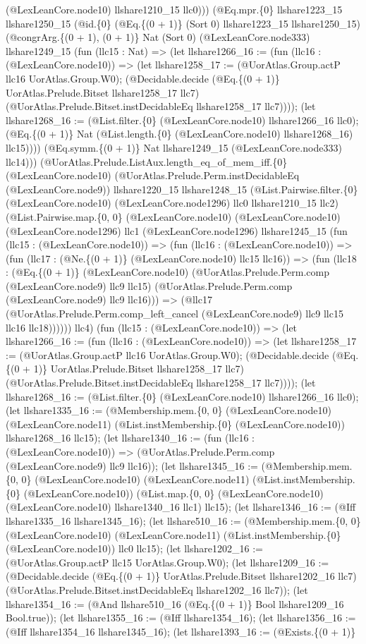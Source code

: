 \documentclass[11pt]{article}
\begin{document}
(@LexLeanCore.node10) llshare1210\_15 llc0))) (@Eq.mpr.\{0\} llshare1223\_15 llshare1250\_15 (@id.\{0\} (@Eq.\{(0 + 1)\} (Sort 0) llshare1223\_15 llshare1250\_15) (@congrArg.\{(0 + 1), (0 + 1)\} Nat (Sort 0) (@LexLeanCore.node333) llshare1249\_15 (fun (llc15 : Nat) => (let llshare1266\_16 := (fun (llc16 : (@LexLeanCore.node10)) => (let llshare1258\_17 := (@UorAtlas.Group.actP llc16 UorAtlas.Group.W0); (@Decidable.decide (@Eq.\{(0 + 1)\} UorAtlas.Prelude.Bitset llshare1258\_17 llc7) (@UorAtlas.Prelude.Bitset.instDecidableEq llshare1258\_17 llc7)))); (let llshare1268\_16 := (@List.filter.\{0\} (@LexLeanCore.node10) llshare1266\_16 llc0); (@Eq.\{(0 + 1)\} Nat (@List.length.\{0\} (@LexLeanCore.node10) llshare1268\_16) llc15)))) (@Eq.symm.\{(0 + 1)\} Nat llshare1249\_15 (@LexLeanCore.node333) llc14))) (@UorAtlas.Prelude.ListAux.length\_eq\_of\_mem\_iff.\{0\} (@LexLeanCore.node10) (@UorAtlas.Prelude.Perm.instDecidableEq (@LexLeanCore.node9)) llshare1220\_15 llshare1248\_15 (@List.Pairwise.filter.\{0\} (@LexLeanCore.node10) (@LexLeanCore.node1296) llc0 llshare1210\_15 llc2) (@List.Pairwise.map.\{0, 0\} (@LexLeanCore.node10) (@LexLeanCore.node10) (@LexLeanCore.node1296) llc1 (@LexLeanCore.node1296) llshare1245\_15 (fun (llc15 : (@LexLeanCore.node10)) => (fun (llc16 : (@LexLeanCore.node10)) => (fun (llc17 : (@Ne.\{(0 + 1)\} (@LexLeanCore.node10) llc15 llc16)) => (fun (llc18 : (@Eq.\{(0 + 1)\} (@LexLeanCore.node10) (@UorAtlas.Prelude.Perm.comp (@LexLeanCore.node9) llc9 llc15) (@UorAtlas.Prelude.Perm.comp (@LexLeanCore.node9) llc9 llc16))) => (@llc17 (@UorAtlas.Prelude.Perm.comp\_left\_cancel (@LexLeanCore.node9) llc9 llc15 llc16 llc18)))))) llc4) (fun (llc15 : (@LexLeanCore.node10)) => (let llshare1266\_16 := (fun (llc16 : (@LexLeanCore.node10)) => (let llshare1258\_17 := (@UorAtlas.Group.actP llc16 UorAtlas.Group.W0); (@Decidable.decide (@Eq.\{(0 + 1)\} UorAtlas.Prelude.Bitset llshare1258\_17 llc7) (@UorAtlas.Prelude.Bitset.instDecidableEq llshare1258\_17 llc7)))); (let llshare1268\_16 := (@List.filter.\{0\} (@LexLeanCore.node10) llshare1266\_16 llc0); (let llshare1335\_16 := (@Membership.mem.\{0, 0\} (@LexLeanCore.node10) (@LexLeanCore.node11) (@List.instMembership.\{0\} (@LexLeanCore.node10)) llshare1268\_16 llc15); (let llshare1340\_16 := (fun (llc16 : (@LexLeanCore.node10)) => (@UorAtlas.Prelude.Perm.comp (@LexLeanCore.node9) llc9 llc16)); (let llshare1345\_16 := (@Membership.mem.\{0, 0\} (@LexLeanCore.node10) (@LexLeanCore.node11) (@List.instMembership.\{0\} (@LexLeanCore.node10)) (@List.map.\{0, 0\} (@LexLeanCore.node10) (@LexLeanCore.node10) llshare1340\_16 llc1) llc15); (let llshare1346\_16 := (@Iff llshare1335\_16 llshare1345\_16); (let llshare510\_16 := (@Membership.mem.\{0, 0\} (@LexLeanCore.node10) (@LexLeanCore.node11) (@List.instMembership.\{0\} (@LexLeanCore.node10)) llc0 llc15); (let llshare1202\_16 := (@UorAtlas.Group.actP llc15 UorAtlas.Group.W0); (let llshare1209\_16 := (@Decidable.decide (@Eq.\{(0 + 1)\} UorAtlas.Prelude.Bitset llshare1202\_16 llc7) (@UorAtlas.Prelude.Bitset.instDecidableEq llshare1202\_16 llc7)); (let llshare1354\_16 := (@And llshare510\_16 (@Eq.\{(0 + 1)\} Bool llshare1209\_16 Bool.true)); (let llshare1355\_16 := (@Iff llshare1354\_16); (let llshare1356\_16 := (@Iff llshare1354\_16 llshare1345\_16); (let llshare1393\_16 := (@Exists.\{(0 + 1)\} 
\end{document}
